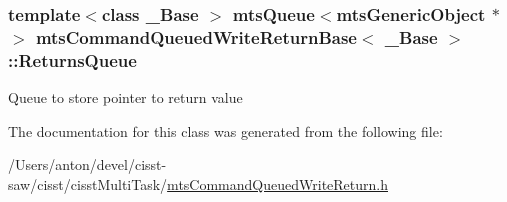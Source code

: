 \subsubsection[{Returns\+Queue}]{\setlength{\rightskip}{0pt plus 5cm}template$<$class \+\_\+\+Base $>$ {\bf mts\+Queue}$<${\bf mts\+Generic\+Object} $\ast$$>$ {\bf mts\+Command\+Queued\+Write\+Return\+Base}$<$ \+\_\+\+Base $>$\+::Returns\+Queue\hspace{0.3cm}{\ttfamily [protected]}}\label{classmts_command_queued_write_return_base_a24118cfab2f7edbc060a3513787900c7}
Queue to store pointer to return value 

The documentation for this class was generated from the following file\+:\begin{DoxyCompactItemize}
\item 
/\+Users/anton/devel/cisst-\/saw/cisst/cisst\+Multi\+Task/\hyperlink{mts_command_queued_write_return_8h}{mts\+Command\+Queued\+Write\+Return.\+h}\end{DoxyCompactItemize}
